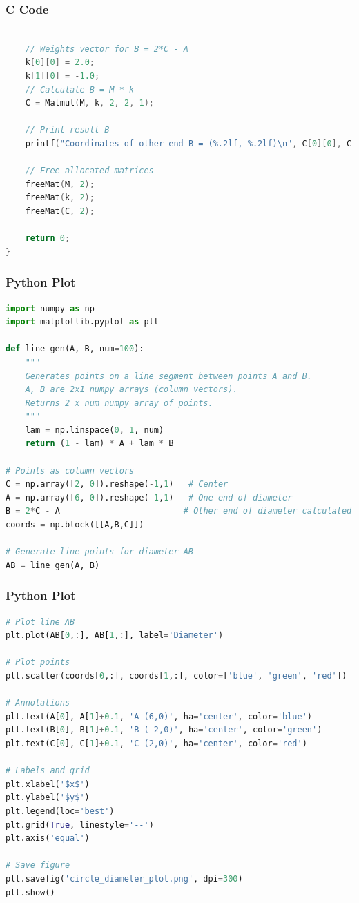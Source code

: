 \documentclass{beamer}
\theoremstyle{remark}
\numberwithin{equation}{section}
\numberwithin{equation}{section}
\begin{document}
\begin{frame}[fragile]
\frametitle{C Code }
\begin{lstlisting}[language=C]

    // Weights vector for B = 2*C - A
    k[0][0] = 2.0;
    k[1][0] = -1.0;
    // Calculate B = M * k
    C = Matmul(M, k, 2, 2, 1);

    // Print result B
    printf("Coordinates of other end B = (%.2lf, %.2lf)\n", C[0][0], C[1][0]);

    // Free allocated matrices
    freeMat(M, 2);
    freeMat(k, 2);
    freeMat(C, 2);

    return 0;
}
\end{lstlisting}
\end{frame}
\begin{frame}[fragile]
\frametitle{Python Plot }
\begin{lstlisting}[language=Python]
import numpy as np
import matplotlib.pyplot as plt

def line_gen(A, B, num=100):
    """
    Generates points on a line segment between points A and B.
    A, B are 2x1 numpy arrays (column vectors).
    Returns 2 x num numpy array of points.
    """
    lam = np.linspace(0, 1, num)
    return (1 - lam) * A + lam * B

# Points as column vectors
C = np.array([2, 0]).reshape(-1,1)   # Center
A = np.array([6, 0]).reshape(-1,1)   # One end of diameter
B = 2*C - A                         # Other end of diameter calculated
coords = np.block([[A,B,C]])

# Generate line points for diameter AB
AB = line_gen(A, B)
\end{lstlisting}
\end{frame}
\begin{frame}[fragile]
\frametitle{Python Plot }
\begin{lstlisting}[language=Python]
# Plot line AB
plt.plot(AB[0,:], AB[1,:], label='Diameter')

# Plot points
plt.scatter(coords[0,:], coords[1,:], color=['blue', 'green', 'red'])

# Annotations
plt.text(A[0], A[1]+0.1, 'A (6,0)', ha='center', color='blue')
plt.text(B[0], B[1]+0.1, 'B (-2,0)', ha='center', color='green')
plt.text(C[0], C[1]+0.1, 'C (2,0)', ha='center', color='red')

# Labels and grid
plt.xlabel('$x$')
plt.ylabel('$y$')
plt.legend(loc='best')
plt.grid(True, linestyle='--')
plt.axis('equal')

# Save figure
plt.savefig('circle_diameter_plot.png', dpi=300)
plt.show()
\end{lstlisting}
\end{frame}
\end{document}
